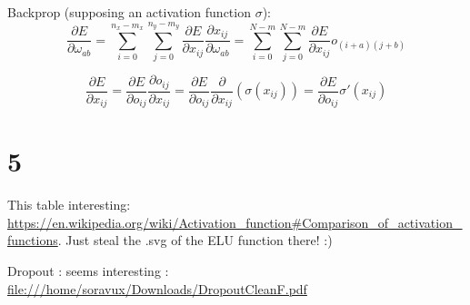 \documentclass[12pt]{article}
\newcommand\p[2]{\frac{\partial #1}{\partial #2}}
\begin{document}
Backprop (supposing an activation function $\sigma$):
\begin{equation}
\p{E}{\omega_{ab}} = \sum_{i=0}^{n_x-m_x}\sum_{j=0}^{n_y-m_y} \p{E}{x_{ij}} \p{x_{ij}}{\omega_{ab}}
= \sum_{i=0}^{N-m}\sum_{j=0}^{N-m} \p{E}{x_{ij}} o_{(i+a)(j+b)}
\end{equation}

\begin{equation}
\p{E}{x_{ij}} = \p{E}{o_{ij}} \p{o_{ij}}{x_{ij}} = 
 \p{E}{o_{ij}} \p{}{x_{ij}}\left(\sigma(x_{ij})\right) = 
 \p{E}{o_{ij}} \sigma'(x_{ij})
\end{equation}


\section*{5}

This table interesting: \url{https://en.wikipedia.org/wiki/Activation_function#Comparison_of_activation_functions}. Just steal the .svg of the ELU function there! :)

Dropout : seems interesting : \url{file:///home/soravux/Downloads/DropoutCleanF.pdf}
\end{document}
